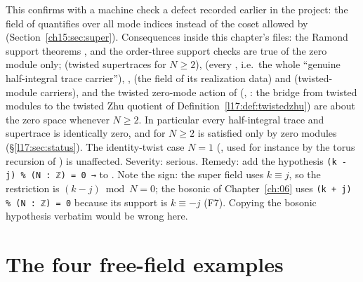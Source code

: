 \begin{warning}[title={Finding (F1): every twisted super theorem with $N\ge2$ is vacuous}]
This confirms with a machine check a defect recorded earlier in the project: the  field of
 quantifies over all mode indices instead of the coset allowed by 
(Section~\ref{ch15:sec:super}). Consequences
inside this chapter's files: the Ramond support theorems ,
 and the order-three support checks are true of the zero module only;
 (twisted supertraces for $N\ge2$),
 (every , i.e.\ the whole
``genuine half-integral trace carrier''), ,
 (the  field of its realization data) and
 (twisted-module carriers), and the
twisted zero-mode action of 
(, : the bridge from
twisted modules to the twisted Zhu quotient of Definition~\ref{l17:def:twistedzhu}) are about the
zero space whenever $N\ge2$. In particular every half-integral trace and supertrace is identically
zero, and  for $N\ge2$ is satisfied only by zero modules
(§\ref{l17:sec:status}). The identity-twist case $N=1$ (, used
for instance by the torus recursion of )
is unaffected. Severity: serious. Remedy: add the hypothesis \texttt{(k - j) \% (N : ℤ) = 0 →} to
. Note the sign: the super  field uses $k\equiv j$, so the restriction is
$(k-j)\bmod N=0$; the bosonic  of Chapter~\ref{ch:06} uses
\texttt{(k + j) \% (N : ℤ) = 0} because its support is $k\equiv-j$ (F7). Copying the bosonic
hypothesis verbatim would be wrong here.
\end{warning}

\section{The four free-field examples}\label{l17:sec:examples}

